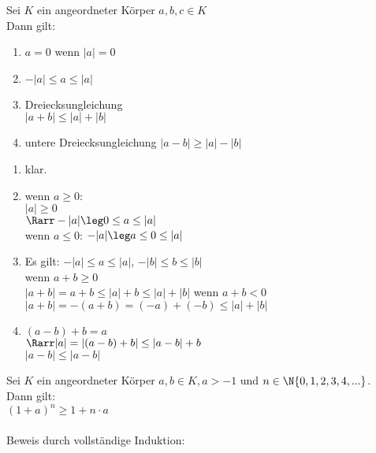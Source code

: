 	Sei $K$ ein angeordneter Körper $a, b, c \in K$\\
	Dann gilt:
	\begin{enumerate}
	\item{$a = 0$ wenn $|a| = 0$}
	\item{$-|a| \leq a \leq |a|$}
	\item{Dreiecksungleichung\\
	$|a + b| \leq |a| + |b|$}
	\item{untere Dreiecksungleichung
	$|a - b| \geq |a| - |b|$} %
	\end{enumerate}
\bew
	\begin{enumerate}
	\item{klar.}
	\item{wenn $a \geq 0$:\\
	$|a| \geq 0$\\
	$\Rarr -|a| \leg 0 \leq a \leq |a|$\\
	wenn $a \leq 0$:
	$-|a| \leg a \leq 0 \leq |a|$}
	\item{Es gilt: $-|a| \leq a \leq |a|$, $-|b| \leq b \leq |b|$\\
	wenn $a + b \geq 0$\\
	$|a + b| = a + b \leq |a| + b \leq |a| + |b|$
	wenn $a + b < 0$\\
	$|a + b| = -(a + b) = (-a) + (-b) \leq |a| + |b|$}
	\item{$(a - b) + b = a$\\
	$\Rarr |a| = |(a - b) + b| \leq |a - b| + b$\\
	$|a - b| \leq |a - b|$} %
	\end{enumerate}
	Sei $K$ ein angeordneter Körper $a, b \in K, a > -1$ und $n \in \N \{0, 1, 2, 3, 4, ...\}$.\\
	Dann gilt:\\
	$(1 + a)^n \geq 1 + n \cdot a$\\
	\\
	Beweis durch vollständige Induktion:
